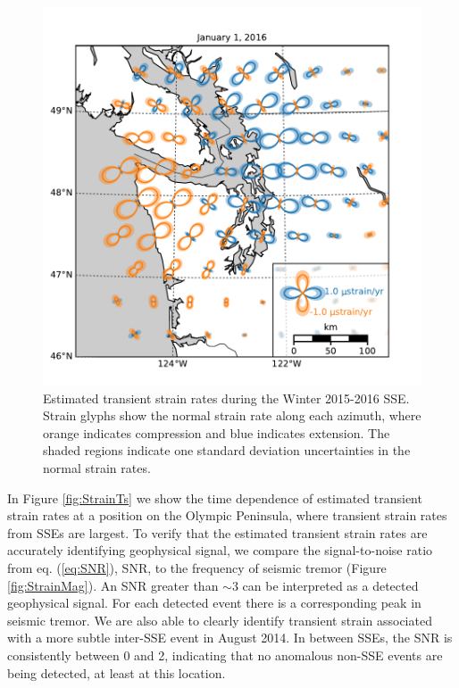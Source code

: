 \documentclass[extra,mreferee]{gji}
\begin{document}
\begin{figure}
\includegraphics{figures/strain_map/strain-map.pdf}
\caption{Estimated transient strain rates during the Winter 2015-2016 SSE. Strain glyphs show the normal strain rate along each azimuth, where orange indicates compression and blue indicates extension. The shaded regions indicate one standard deviation uncertainties in the normal strain rates.}   
\label{fig:StrainMap}
\end{figure}

In Figure \ref{fig:StrainTs} we show the time dependence of estimated transient strain rates at a position on the Olympic Peninsula, where transient strain rates from SSEs are largest. To verify that the estimated transient strain rates are accurately identifying geophysical signal, we compare the signal-to-noise ratio from eq. (\ref{eq:SNR}), SNR, to the frequency of seismic tremor (Figure \ref{fig:StrainMag}). An SNR greater than ${\sim}3$ can be interpreted as a detected geophysical signal. For each detected event there is a corresponding peak in seismic tremor. We are also able to clearly identify transient strain associated with a more subtle inter-SSE event in August 2014. In between SSEs, the SNR is consistently between 0 and 2, indicating that no anomalous non-SSE events are being detected, at least at this location. 
\end{document}
